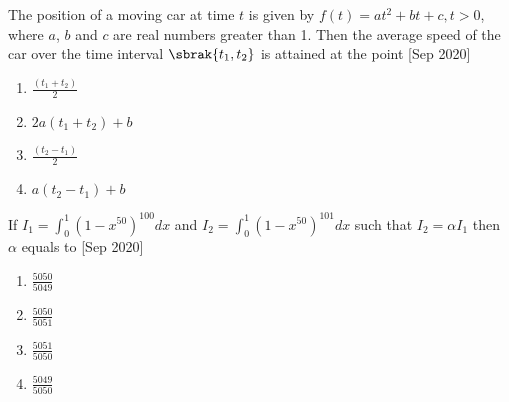     \item The position of a moving car at time $t$ is given by $f(t) = at^2+bt+c, t > 0$, where $a$, $b$ and $c$ are real numbers greater than 1. Then the average speed of the car over the time interval $\sbrak{t_1, t_2}$ is attained at the point \hfill [Sep 2020]

    \begin{multicols}{4}
    \begin{enumerate}
        \item $\frac{(t_1+t_2)}{2}$
        \item $2a(t_1+t_2)+b$
        \item $\frac{(t_2-t_1)}{2}$
        \item $a(t_2-t_1)+b$
    \end{enumerate}
    \end{multicols}
    
    \item If $I_1 = \int_{0}^{1}(1-x^{50})^{100} dx$ and $I_2 = \int_{0}^{1}(1-x^{50})^{101} dx$ such that $I_2 = \alpha I_1$ then $\alpha$ equals to \hfill [Sep 2020]
    
    \begin{multicols}{4}
    \begin{enumerate}
        \item $\frac{5050}{5049}$
        \item $\frac{5050}{5051}$
        \item $\frac{5051}{5050}$
        \item $\frac{5049}{5050}$
    \end{enumerate}
    \end{multicols}
    
